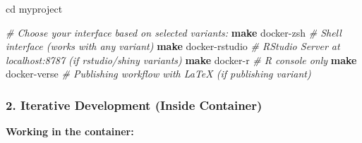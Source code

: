 \documentclass[
]{article}
\newenvironment{Shaded}{\begin{snugshade}}{\end{snugshade}}
\newcommand{\BuiltInTok}[1]{#1}
\newcommand{\CommentTok}[1]{\textcolor[rgb]{0.56,0.35,0.01}{\textit{#1}}}
\newcommand{\FunctionTok}[1]{\textcolor[rgb]{0.13,0.29,0.53}{\textbf{#1}}}
\newcommand{\NormalTok}[1]{#1}
\begin{document}
\begin{Shaded}
\begin{Highlighting}[]
\BuiltInTok{cd}\NormalTok{ myproject}

\CommentTok{\# Choose your interface based on selected variants:}
\FunctionTok{make}\NormalTok{ docker{-}zsh         }\CommentTok{\# Shell interface (works with any variant)}
\FunctionTok{make}\NormalTok{ docker{-}rstudio     }\CommentTok{\# RStudio Server at localhost:8787 (if rstudio/shiny variants)}
\FunctionTok{make}\NormalTok{ docker{-}r           }\CommentTok{\# R console only}
\FunctionTok{make}\NormalTok{ docker{-}verse       }\CommentTok{\# Publishing workflow with LaTeX (if publishing variant)}
\end{Highlighting}
\end{Shaded}

\subsubsection{2. Iterative Development (Inside
Container)}\label{iterative-development-inside-container}

\textbf{Working in the container:}
\end{document}
